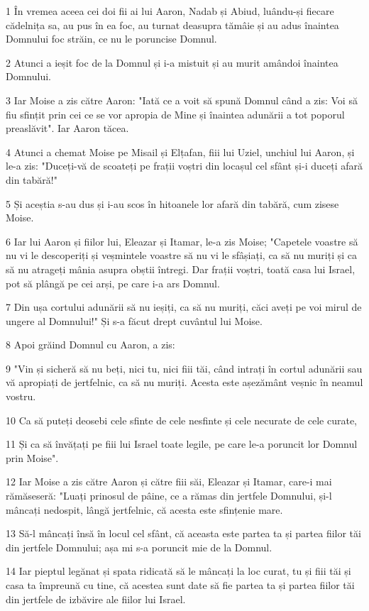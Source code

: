 \par 1 În vremea aceea cei doi fii ai lui Aaron, Nadab și Abiud, luându-și fiecare cădelnița sa, au pus în ea foc, au turnat deasupra tămâie și au adus înaintea Domnului foc străin, ce nu le poruncise Domnul.
\par 2 Atunci a ieșit foc de la Domnul și i-a mistuit și au murit amândoi înaintea Domnului.
\par 3 Iar Moise a zis către Aaron: "Iată ce a voit să spună Domnul când a zis: Voi să fiu sfințit prin cei ce se vor apropia de Mine și înaintea adunării a tot poporul preaslăvit". Iar Aaron tăcea.
\par 4 Atunci a chemat Moise pe Misail și Elțafan, fiii lui Uziel, unchiul lui Aaron, și le-a zis: "Duceți-vă de scoateți pe frații voștri din locașul cel sfânt și-i duceți afară din tabără!"
\par 5 Și aceștia s-au dus și i-au scos în hitoanele lor afară din tabără, cum zisese Moise.
\par 6 Iar lui Aaron și fiilor lui, Eleazar și Itamar, le-a zis Moise; "Capetele voastre să nu vi le descoperiți și veșmintele voastre să nu vi le sfâșiați, ca să nu muriți și ca să nu atrageți mânia asupra obștii întregi. Dar frații voștri, toată casa lui Israel, pot să plângă pe cei arși, pe care i-a ars Domnul.
\par 7 Din ușa cortului adunării să nu ieșiți, ca să nu muriți, căci aveți pe voi mirul de ungere al Domnului!" Și s-a făcut drept cuvântul lui Moise.
\par 8 Apoi grăind Domnul cu Aaron, a zis:
\par 9 "Vin și sicheră să nu beți, nici tu, nici fiii tăi, când intrați în cortul adunării sau vă apropiați de jertfelnic, ca să nu muriți. Acesta este așezământ veșnic în neamul vostru.
\par 10 Ca să puteți deosebi cele sfinte de cele nesfinte și cele necurate de cele curate,
\par 11 Și ca să învățați pe fiii lui Israel toate legile, pe care le-a poruncit lor Domnul prin Moise".
\par 12 Iar Moise a zis către Aaron și către fiii săi, Eleazar și Itamar, care-i mai rămăseseră: "Luați prinosul de pâine, ce a rămas din jertfele Domnului, și-l mâncați nedospit, lângă jertfelnic, că acesta este sfințenie mare.
\par 13 Să-l mâncați însă în locul cel sfânt, că aceasta este partea ta și partea fiilor tăi din jertfele Domnului; așa mi s-a poruncit mie de la Domnul.
\par 14 Iar pieptul legănat și spata ridicată să le mâncați la loc curat, tu și fiii tăi și casa ta împreună cu tine, că acestea sunt date să fie partea ta și partea fiilor tăi din jertfele de izbăvire ale fiilor lui Israel.
